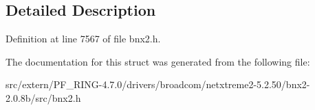 \subsection{Detailed Description}


Definition at line 7567 of file bnx2.h.



The documentation for this struct was generated from the following file:\begin{DoxyCompactItemize}
\item 
src/extern/PF\_\-RING-\/4.7.0/drivers/broadcom/netxtreme2-\/5.2.50/bnx2-\/2.0.8b/src/bnx2.h\end{DoxyCompactItemize}
